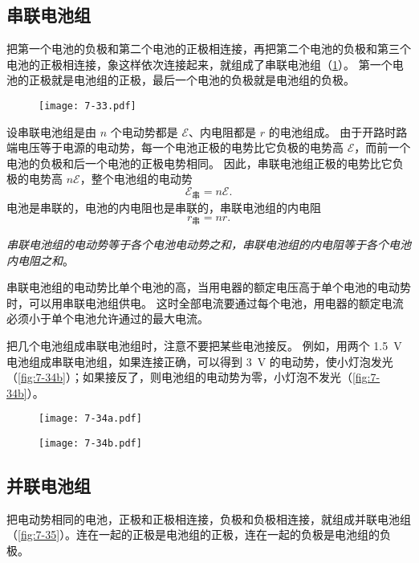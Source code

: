 \subsection{串联电池组}

把第一个电池的负极和第二个电池的正极相连接，再把第二个电池的负极和第三个电池的正极相连接，象这样依次连接起来，就组成了串联电池组（\cref{fig:7-33}）。
第一个电池的正极就是电池组的正极，最后一个电池的负极就是电池组的负极。
\begin{figure}
  \texttt{[image: 7-33.pdf]}
  \caption{}\label{fig:7-33}
\end{figure}	

设串联电池组是由 $n$ 个电动势都是 $\mathcal{E}$、内电阻都是 $r$ 的电池组成。
由于开路时路端电压等于电源的电动势，每一个电池正极的电势比它负极的电势高 $\mathcal{E}$，而前一个电池的负极和后一个电池的正极电势相同。
因此，串联电池组正极的电势比它负极的电势高 $n\mathcal{E}$，整个电池组的电动势
\[\mathcal{E}_{\text{串}}=n\mathcal{E}.\]
电池是串联的，电池的内电阻也是串联的，串联电池组的内电阻
\[r_{\text{串}}=nr.\]

\emph{串联电池组的电动势等于各个电池电动势之和，串联电池组的内电阻等于各个电池内电阻之和}。

串联电池组的电动势比单个电池的高，当用电器的额定电压高于单个电池的电动势时，可以用串联电池组供电。
这时全部电流要通过每个电池，用电器的额定电流必须小于单个电池允许通过的最大电流。

把几个电池组成串联电池组时，注意不要把某些电池接反。
例如，用两个 \qty{1.5}{V} 电池组成串联电池组，如果连接正确，可以得到 \qty{3}{V} 的电动势，使小灯泡发光（\cref{fig:7-34b}）；如果接反了，则电池组的电动势为零，小灯泡不发光（\cref{fig:7-34b}）。

\begin{figure}
  \begin{minipage}{0.45\linewidth}\centering
    \texttt{[image: 7-34a.pdf]} 
    \subcaption{}\label{fig:7-34a}
  \end{minipage}
  \begin{minipage}{0.45\linewidth}\centering
    \texttt{[image: 7-34b.pdf]}
    \subcaption{}\label{fig:7-34b}
  \end{minipage}
  \caption{}\label{fig:7-34}
\end{figure}

\subsection{并联电池组}
把电动势相同的电池，正极和正极相连接，负极和负极相连接，就组成并联电池组（\cref{fig:7-35}）。连在一起的正极是电池组的正极，连在一起的负极是电池组的负极。

